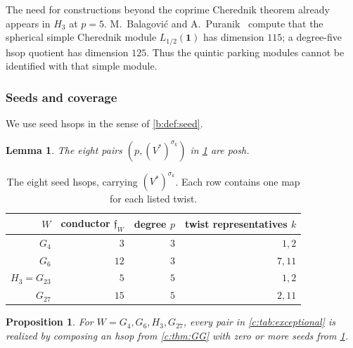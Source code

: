 \documentclass[10pt,a4paper]{amsart}
\newtheorem{proposition}[theorem]{Proposition}
\newtheorem{lemma}[theorem]{Lemma}
\theoremstyle{definition}
\begin{document}
The need for constructions beyond the coprime Cherednik theorem
already appears in $H_3$ at $p=5$. M.~Balagovi\'c and A.~Puranik~\cite[Theorem 10.1]{BalagovicPuranik} compute
that the spherical simple Cherednik module $L_{1/2}(\mathbf1)$ has
dimension $115$; a degree-five
hsop quotient has dimension $125$. Thus the quintic parking modules
cannot be identified with that simple module.

\subsubsection{Seeds and coverage}\label{c:sec:noncoprime}

We use seed hsops in the sense of \cref{b:def:seed}.

\begin{lemma}\label{c:lem:seeds}
The eight pairs $(p,(V^*)^{\sigma_k})$ in \cref{tab:seeds} are posh.
\end{lemma}

\begin{table}[htbp]
\centering
\begin{tabular}{@{}rrrr@{}}
\toprule
$W$ & conductor $\mathfrak f_W$ & degree $p$ & twist representatives $k$\\
\midrule
$G_4$ & $3$ & $3$ & $1,2$\\
$G_6$ & $12$ & $3$ & $7,11$\\
$H_3=G_{23}$ & $5$ & $5$ & $1,2$\\
$G_{27}$ & $15$ & $5$ & $2,11$\\
\bottomrule
\end{tabular}
\caption{The eight seed hsops, carrying $(V^*)^{\sigma_k}$.
Each row contains one map for each listed twist.}\label{tab:seeds}
\end{table}

\begin{proposition}\label{c:prop:seed-coverage}
For $W=G_4,G_6,H_3,G_{27}$, every pair in
\cref{c:tab:exceptional} is realized by composing an hsop from
\cref{c:thm:GG} with zero or more seeds from \cref{c:lem:seeds}.
\end{proposition}
\end{document}
